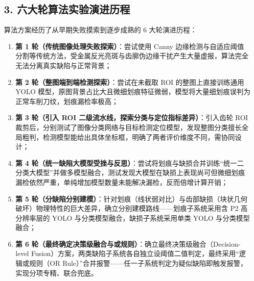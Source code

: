 \subsection*{3. 六大轮算法实验演进历程}
算法方案经历了从早期失败摸索到逐步成熟的 6 大轮演进历程：
\begin{enumerate}
    \item \textbf{第 1 轮（传统图像处理失败探索）}：尝试使用 Canny 边缘检测与自适应阈值分割等传统方法，受金属反光亮斑与齿廓伪边缘干扰产生大量虚报，算法完全无法分离真实缺陷与正常背景；
    \item \textbf{第 2 轮（整图端到端检测探索）}：尝试在未截取 ROI 的整图上直接训练通用 YOLO 模型，原图背景占比大且微细划痕特征微弱，模型将大量细划痕误判为正常车削刀纹，划痕漏检率极高；
    \item \textbf{第 3 轮（引入 ROI 二级流水线，探索分类与定位指标差异）}：引入齿轮 ROI 裁剪后，分别测试了图像分类网络与目标检测定位模型，发现整图分类擅长全局粗判，检测模型能给出具体坐标框，明确了两者评价维度不同，需协同设计；
    \item \textbf{第 4 轮（统一缺陷大模型受挫与反思）}：尝试将划痕与缺损合并训练“统一二分类大模型”并做多模型融合，测试发现大模型在缺损上表现尚可但微细划痕漏检依然严重，单纯增加模型数量未能解决漏检，反而倍增计算开销；
    \item \textbf{第 5 轮（分缺陷分别建模）}：针对划痕（线状弱对比）与齿部缺损（块状几何破坏）物理特性的巨大差异，确立分别建模路线——划痕子系统采用含 P2 高分辨率层的 YOLO 与分类模型融合，缺损子系统采用单类 YOLO 与分类模型融合；
    \item \textbf{第 6 轮（最终确定决策级融合与或规则）}：确立最终决策级融合（Decision-level Fusion）方案，两类缺陷子系统各自独立设阈值二值判定，最终采用“逻辑或规则（OR Rule）”合并报警——任一子系统判定为疑似缺陷即触发报警，实现分项专精、联合兜底。
\end{enumerate}

